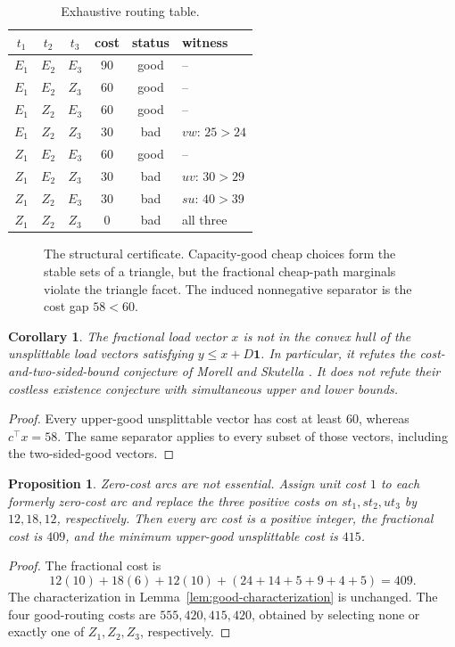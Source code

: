 \documentclass[11pt]{article}
\newtheorem{corollary}[theorem]{Corollary}
\newtheorem{proposition}[theorem]{Proposition}
\theoremstyle{definition}
\newcommand{\one}{\mathbf{1}}
\begin{document}
\begin{table}[ht]
\centering
\caption{Exhaustive routing table.}
\label{tab:routings}
\begin{tabular}{@{}cccccl@{}}
\toprule
$t_1$ & $t_2$ & $t_3$ & cost & status & witness\\
\midrule
$E_1$&$E_2$&$E_3$&90&good&--\\
$E_1$&$E_2$&$Z_3$&60&good&--\\
$E_1$&$Z_2$&$E_3$&60&good&--\\
$E_1$&$Z_2$&$Z_3$&30&bad&$vw$: $25>24$\\
$Z_1$&$E_2$&$E_3$&60&good&--\\
$Z_1$&$E_2$&$Z_3$&30&bad&$uv$: $30>29$\\
$Z_1$&$Z_2$&$E_3$&30&bad&$su$: $40>39$\\
$Z_1$&$Z_2$&$Z_3$&0&bad&all three\\
\bottomrule
\end{tabular}
\end{table}

\begin{figure}[ht]
\centering

\caption{The structural certificate.  Capacity-good cheap choices form the
stable sets of a triangle, but the fractional cheap-path marginals violate
the triangle facet.  The induced nonnegative separator is the cost gap
$58<60$.}
\label{fig:obstruction}
\end{figure}

\begin{corollary}\label{cor:convex}
The fractional load vector $x$ is not in the convex hull of the unsplittable
load vectors satisfying $y\le x+D\one$.  In particular, it refutes the
cost-and-two-sided-bound conjecture of Morell and Skutella
\cite[Conjecture~2]{MorellSkutella2022}.  It does not refute their costless
existence conjecture with simultaneous upper and lower bounds.
\end{corollary}
\begin{proof}
Every upper-good unsplittable vector has cost at least $60$, whereas
$c^\top x=58$.  The same separator applies to every subset of those vectors,
including the two-sided-good vectors.
\end{proof}

\begin{proposition}\label{prop:positive-cost}
Zero-cost arcs are not essential.  Assign unit cost $1$ to each formerly
zero-cost arc and replace the three positive costs on $st_1,st_2,ut_3$ by
$12,18,12$, respectively.  Then every arc cost is a positive integer, the
fractional cost is $409$, and the minimum upper-good unsplittable cost is
$415$.
\end{proposition}
\begin{proof}
The fractional cost is
\[
 12(10)+18(6)+12(10)+(24+14+5+9+4+5)=409.
\]
The characterization in Lemma~\ref{lem:good-characterization} is unchanged.
The four good-routing costs are $555,420,415,420$, obtained by selecting none
or exactly one of $Z_1,Z_2,Z_3$, respectively.
\end{proof}
\end{document}

